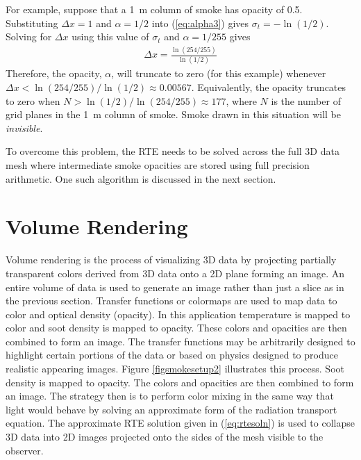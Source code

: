 {For example, suppose that a 1~m column of smoke has opacity of
0.5.  Substituting $\Delta x=1$ and $\alpha=1/2$ into
(\ref{eq:alpha3}) gives $\sigma_t=-\ln(1/2)$.  Solving for $\Delta
x$ using this value of $\sigma_t$ and $\alpha=1/255$ gives
\begin{eqnarray}
\Delta x = \frac{\ln(254/255)}{\ln(1/2)}
\end{eqnarray}
Therefore, the opacity, $\alpha$, will truncate to zero (for this
example) whenever $\Delta x<\ln(254/255)/\ln(1/2)\approx 0.00567$.
Equivalently, the opacity truncates to zero when
$N>\ln(1/2)/\ln(254/255)\approx 177$, where $N$ is the number of
grid planes in the 1~m column of smoke.  Smoke drawn in this
situation will be {\em invisible}.

To overcome this problem, the RTE needs to be solved across the
full 3D data mesh where intermediate smoke opacities are stored
using full precision arithmetic.  One such algorithm is discussed
in the next section.


\section{Volume Rendering}
Volume rendering is the process of visualizing 3D data by
projecting partially transparent colors derived from 3D data onto
a 2D plane forming an image.  An entire volume of data is used to
generate an image rather than just a slice as in the previous
section.  Transfer functions or colormaps are used to map data to
color and optical density (opacity).  In this application
temperature is mapped to color and soot density is mapped to
opacity.  These colors and opacities are then combined to form an
image.  The transfer functions may be arbitrarily designed to
highlight certain portions of the data or based on physics
designed to produce realistic appearing images.  Figure
\ref{figsmokesetup2} illustrates this process. Soot density is
mapped to opacity.  The colors and opacities are then combined to
form an image.  The strategy then is to perform color mixing in
the same way that light would behave by solving an approximate
form of the radiation transport equation.  The approximate RTE
solution given in (\ref{eq:rtesoln})  is used to collapse 3D data
into 2D images projected onto the sides of the mesh visible to the
observer.

}
